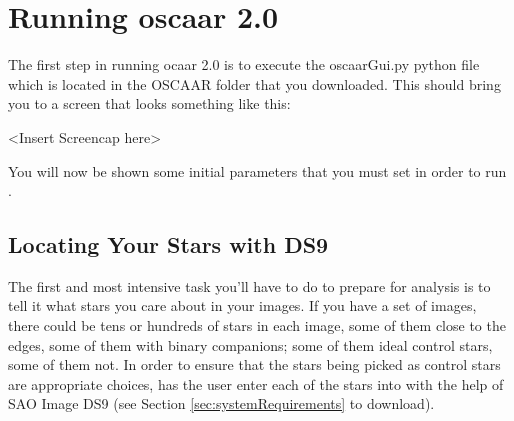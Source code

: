 \documentclass{article}
\begin{document}
\section{Running oscaar 2.0}

The first step in running ocaar 2.0 is to execute the oscaarGui.py python file which is located in the OSCAAR folder that you downloaded. This should bring you to a screen that looks something like this:

<Insert Screencap here>

You will now be shown some initial parameters that you must set in order to run \oscaar.


\subsection{Locating Your Stars with DS9}

The first and most intensive task you'll have to do to prepare \oscaar  for analysis is to tell it what stars you care about in your images. If you have a set of images, there could be tens or hundreds of stars in each image, some of them close to the edges, some of them with binary companions; some of them ideal control stars, some of them not. In order to ensure that the stars being picked as control stars are appropriate choices, \oscaar has the user enter each of the stars into \oscaar with the help of SAO Image DS9 (see Section \ref{sec:systemRequirements} to download). 
\end{document}

